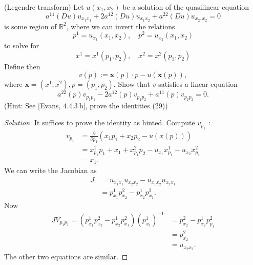 
\begin{problem}
	(Legendre transform) Let $u\left(x_1, x_2\right)$ be a solution of the quasilinear equation
\[
a^{11}(D u) u_{x_1 x_1}+2 a^{12}(D u) u_{x_1 x_2}+a^{22}(D u) u_{x_2, x_2}=0
\]
is some region of $\mathbb{R}^2$, where we can invert the relations
\[
p^1=u_{x_1}\left(x_1, x_2\right), \quad p^2=u_{x_2}\left(x_1, x_2\right)
\]
to solve for
\[
x^1=x^1\left(p_1, p_2\right), \quad x^2=x^2\left(p_1, p_2\right)
\]
Define then
\[
v(p):=\mathbf{x}(p) \cdot p-u(\mathbf{x}(p)),
\]
where $\mathbf{x}=\left(x^1, x^2\right), p=\left(p_1, p_2\right)$. Show that $v$ satisfies a linear equation
\[
a^{22}(p) v_{p_1 p_1}-2 a^{12}(p) v_{p_1 p_2}+a^{11}(p) v_{p_2 p_2}=0 .
\]
(Hint: See [Evans, $4.4 .3 \mathrm{~b}]$, prove the identities (29))
\end{problem}
\begin{proof}[Solution]
	It suffices to prove the identity as hinted. Compute $v_{p_1}$ :
	\begin{align*}
		v_{p_1}
		&= \frac{\partial }{\partial p_1} \left( x_1 p_1 + x_2 p_2  - u(x(p))\right) \\
		&= x^1_{p_1} p_1 + x_1 + x^2_{p_1} p_2 - u_{x_1} x^1_{p_1} - u_{x_2} x^2_{p_1} \\
		&= x_1
	.\end{align*}
	We can write the Jacobian as
	\begin{align*}
		J &= u_{x_1 x_1} u_{x_2 x_2} - u_{x_1 x_2} u_{x_2 x_1} \\
		&= p^1_{x_1} p^2_{x_2} - p^1_{x_2} p^2 _{x_1}
	.\end{align*} 
	Now 
	\begin{align*}
		J V_{p_1 p_1} = \left( p^1_{x_1} p^2_{x_2} - p^1_{x_2} p^2 _{x_1} \right) (p^1_{x_1})^{-1}
		&= p^2_{x_2} - p^1_{x_2} p^2_{p_1} \\
		&= p^2_{x_2} \\
		&= u_{x_2 x_2}
	.\end{align*}
	The other two equations are similar.
\end{proof}


